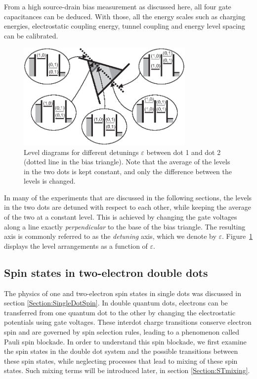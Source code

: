\documentclass[12pt,aps,nofootinbib]{revtex4-1}
\begin{document}
From a high source-drain bias measurement as discussed here, all four gate
capacitances can be deduced. With those, all the energy scales
such as charging energies, electrostatic coupling energy, tunnel
coupling and energy level spacing can be calibrated.

\begin{figure}[htb]
\includegraphics[width=3.4in, clip=true]{hanson_fig31.eps}
\caption{Level diagrams for different detunings $\varepsilon$ between dot 1 and
dot 2 (dotted line in the bias triangle). Note that the average of
the levels in the two dots is kept constant, and only the
difference between the levels is changed.} \label{Fig:DDdetuning}
\end{figure}

In many of the experiments that are discussed in the following
sections, the levels in the two dots are detuned with respect to
each other, while keeping the average of the two at a constant
level. This is achieved by changing the gate voltages along a line
exactly \textit{perpendicular} to the base of the bias triangle.
The resulting axis is commonly referred to as the
\textit{detuning} axis, which we denote by $\varepsilon$. Figure~\ref{Fig:DDdetuning} displays the
level arrangements as a function of $\varepsilon$.

\subsection{Spin states in two-electron double dots}
\label{Sec:DDspinstates}
The physics of one and two-electron spin states in single dots was discussed in section
\ref{Section:SingleDotSpin}. In double quantum dots, electrons can
be transferred from one quantum dot to the other by changing the
electrostatic potentials using gate voltages. These interdot
charge transitions conserve electron spin and are governed by spin
selection rules, leading to a phenomenon called Pauli spin
blockade. In order to understand this spin blockade, we first
examine the spin states in the double dot system and the possible
transitions between these spin states, while neglecting processes
that lead to mixing of these spin states. Such mixing terms will
be introduced later, in section \ref{Section:STmixing}.
\end{document}
